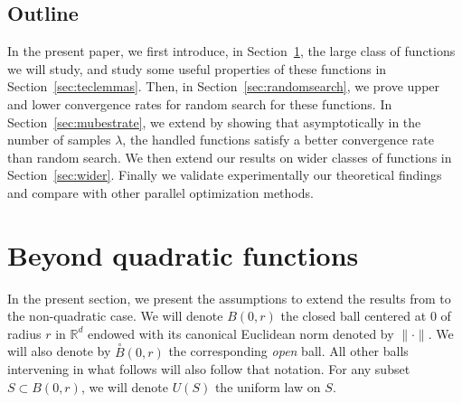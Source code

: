 \subsection{Outline}
In the present paper, we first introduce, in Section~\ref{sec:assumptions}, the large class of functions we will study, and study some useful properties of these functions in Section~\ref{sec:teclemmas}. Then, in Section~\ref{sec:randomsearch}, we prove upper and lower convergence rates for random search for these functions. In Section~\ref{sec:mubestrate}, we extend \cite{ppsnkbest} by showing that asymptotically in the number of samples $\lambda$, the handled functions satisfy a better convergence rate than random search. We then extend our results on wider classes of functions in Section~\ref{sec:wider}. Finally we validate experimentally our theoretical findings and compare with other parallel optimization methods.

\section{Beyond quadratic functions}
\label{sec:assumptions}
In the present section, we present the assumptions to extend the results from \cite{ppsnkbest} to the non-quadratic case. We will denote $B(0,r)$ the closed ball centered at $0$ of radius $r$ in $\mathbb{R}^d$ endowed with its canonical Euclidean norm denoted by $\lVert\cdot\rVert$. We will also denote by $\overset{\circ}{B}(0,r)$ the corresponding \emph{open} ball. All other balls intervening in what follows will also follow that notation. For any subset $S\subset B(0,r)$, we will denote $U(S)$ the uniform law on $S$. 

